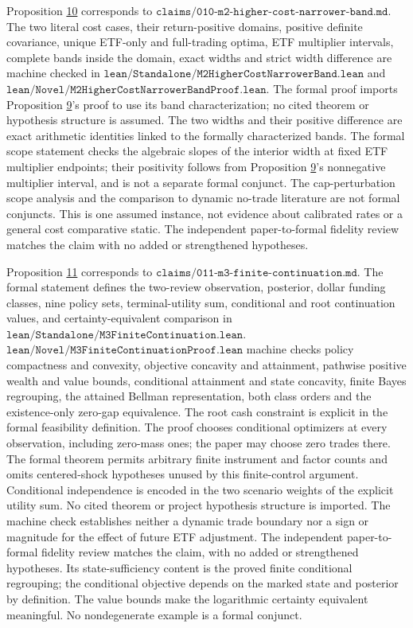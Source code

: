\documentclass[11pt]{article}
\begin{document}
Proposition \hyperref[res:Proposition-10]{10} corresponds to
\(\texttt{claims/010-m2-higher-cost-narrower-band.md}\). The two
literal cost cases, their return-positive domains, positive
definite covariance, unique ETF-only and full-trading optima,
ETF multiplier intervals, complete bands inside the domain,
exact widths and strict width difference are machine checked in
\(\texttt{lean/Standalone/M2HigherCostNarrowerBand.lean}\) and
\(\texttt{lean/Novel/M2HigherCostNarrowerBandProof.lean}\).
The formal proof imports Proposition \hyperref[res:Proposition-9]{9}'s proof to use its band
characterization; no cited theorem or hypothesis structure is
assumed. The two widths and their positive difference are exact
arithmetic identities linked to the formally characterized bands.
The formal scope statement checks the algebraic slopes of the
interior width at fixed ETF multiplier endpoints; their positivity
follows from Proposition \hyperref[res:Proposition-9]{9}'s nonnegative multiplier interval, and
is not a separate formal conjunct. The cap-perturbation scope
analysis and the comparison to dynamic no-trade literature are not
formal conjuncts. This is one assumed instance, not evidence about
calibrated rates or a general cost comparative static. The
independent paper-to-formal fidelity review matches the claim with
no added or strengthened hypotheses.

Proposition \hyperref[res:Proposition-11]{11} corresponds to
\(\texttt{claims/011-m3-finite-continuation.md}\). The formal
statement defines the two-review observation, posterior, dollar
funding classes, nine policy sets, terminal-utility sum,
conditional and root continuation values, and certainty-equivalent
comparison in
\(\texttt{lean/Standalone/M3FiniteContinuation.lean}\).
\(\texttt{lean/Novel/M3FiniteContinuationProof.lean}\) machine
checks policy compactness and convexity, objective concavity and
attainment, pathwise positive wealth and value bounds, conditional
attainment and state concavity, finite Bayes regrouping, the
attained Bellman representation, both class orders and the
existence-only zero-gap equivalence. The root cash constraint is
explicit in the formal feasibility definition. The proof chooses
conditional optimizers at every observation, including zero-mass
ones; the paper may choose zero trades there. The formal theorem
permits arbitrary finite instrument and factor counts and omits
centered-shock hypotheses unused by this finite-control argument.
Conditional independence is encoded in the two scenario weights
of the explicit utility sum. No cited theorem or project
hypothesis structure is imported. The machine check establishes
neither a dynamic trade boundary nor a sign or magnitude for the
effect of future ETF adjustment. The independent paper-to-formal
fidelity review matches the claim, with no added or strengthened
hypotheses. Its state-sufficiency content is the proved finite
conditional regrouping; the conditional objective depends on the
marked state and posterior by definition. The value bounds make
the logarithmic certainty equivalent meaningful. No
nondegenerate example is a formal conjunct.
\end{document}
